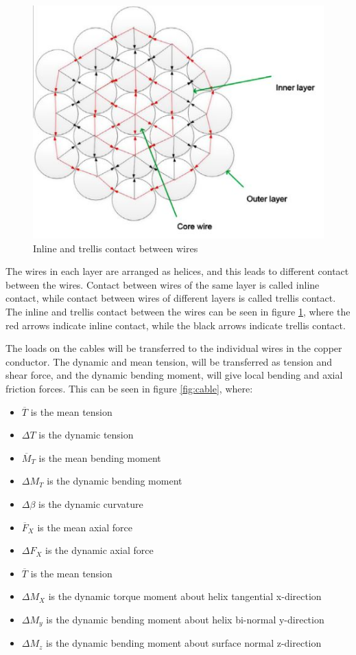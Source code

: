   \begin{figure}[H]
\centering
\includegraphics[scale=0.9]{figures/cross}
\caption[$\; \:$Inline and trellis contact between wires]{Inline and trellis contact between wires \cite{Nasution2013} }
 \label{fig:cross}
\end{figure}
  
 \noindent The wires in each layer are arranged as helices, and this leads to different contact between the wires. Contact between wires of the same layer is called inline contact, while contact between wires of different layers is called trellis contact. \cite{Nasution2013} The inline and trellis contact between the wires can be seen in figure \ref{fig:cross}, where the red arrows indicate inline contact, while the black arrows indicate trellis contact. 

\noindent The loads on the cables will be transferred to the individual wires in the copper conductor. The dynamic and mean tension, will be transferred as tension and shear force, and the dynamic bending moment, will give local bending and axial friction forces. This can be seen in figure \ref{fig:cable}, where:
\begin{itemize}
    \item $\overline T$ is the mean tension
    \item $\Delta T$ is the dynamic tension
    \item $\overline M_T$ is the mean bending moment
    \item $\Delta M_T$ is the dynamic bending moment
    \item $\Delta \beta$ is the dynamic curvature
    \item $\overline F_X$ is the mean axial force
    \item $\Delta F_X$ is the dynamic axial force
    \item $\overline T$ is the mean tension
    \item $\Delta M_X$ is the dynamic torque moment about helix tangential x-direction
    \item $\Delta M_y$ is the dynamic bending moment about helix bi-normal y-direction
    \item $\Delta M_z$ is the dynamic bending moment about surface normal z-direction
\end{itemize}



